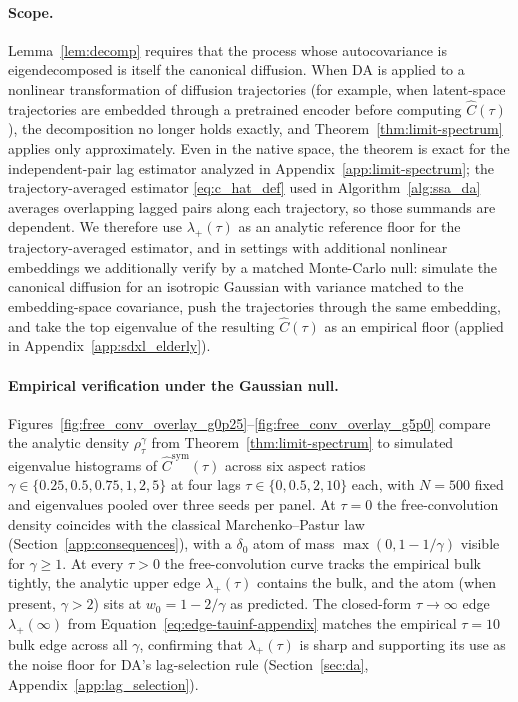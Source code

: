 \documentclass{article}
\begin{document}
\paragraph{Scope.}
Lemma~\ref{lem:decomp} requires that the process whose autocovariance
is eigendecomposed is itself the canonical diffusion. When DA is
applied to a nonlinear transformation of diffusion trajectories (for
example, when latent-space trajectories are embedded through a
pretrained encoder before computing $\hat C(\tau)$), the
decomposition no longer holds exactly, and Theorem~\ref{thm:limit-spectrum}
applies only approximately. Even in the native space, the theorem is
exact for the independent-pair lag estimator analyzed in
Appendix~\ref{app:limit-spectrum}; the trajectory-averaged estimator
\eqref{eq:c_hat_def} used in Algorithm~\ref{alg:ssa_da} averages
overlapping lagged pairs along each trajectory, so those summands are
dependent. We therefore use $\lambda_+(\tau)$ as an analytic
reference floor for the trajectory-averaged estimator, and
in settings with additional nonlinear embeddings we additionally verify
by a matched Monte-Carlo null: simulate the canonical diffusion for an
isotropic Gaussian with variance matched to the embedding-space
covariance, push the trajectories through the same embedding, and take
the top eigenvalue of the resulting $\hat C(\tau)$ as an empirical
floor (applied in Appendix~\ref{app:sdxl_elderly}).

\paragraph{Empirical verification under the Gaussian null.}
Figures~\ref{fig:free_conv_overlay_g0p25}--\ref{fig:free_conv_overlay_g5p0} compare the analytic density $\rho_\tau^\gamma$ from Theorem~\ref{thm:limit-spectrum} to simulated eigenvalue histograms of $\hat C^{\mathrm{sym}}(\tau)$ across six aspect ratios $\gamma \in \{0.25, 0.5, 0.75, 1, 2, 5\}$ at four lags $\tau \in \{0, 0.5, 2, 10\}$ each, with $N = 500$ fixed and eigenvalues pooled over three seeds per panel. At $\tau = 0$ the free-convolution density coincides with the classical Marchenko--Pastur law (Section~\ref{app:consequences}), with a $\delta_0$ atom of mass $\max(0, 1-1/\gamma)$ visible for $\gamma \ge 1$. At every $\tau > 0$ the free-convolution curve tracks the empirical bulk tightly, the analytic upper edge $\lambda_+(\tau)$ contains the bulk, and the atom (when present, $\gamma > 2$) sits at $w_0 = 1 - 2/\gamma$ as predicted. The closed-form $\tau \to \infty$ edge $\lambda_+(\infty)$ from Equation~\eqref{eq:edge-tauinf-appendix} matches the empirical $\tau = 10$ bulk edge across all $\gamma$, confirming that $\lambda_+(\tau)$ is sharp and supporting its use as the noise floor for DA's lag-selection rule (Section~\ref{sec:da}, Appendix~\ref{app:lag_selection}).
\end{document}

